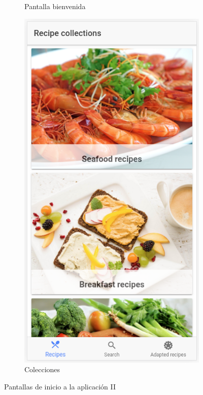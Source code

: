 \begin{figure}[H]
\begin{subfigure}[b]{0.32\linewidth}
        \caption{Pantalla bienvenida}
        \label{fig:app_welcome}
    \end{subfigure}
        \begin{subfigure}[b]{0.32\linewidth}
        \includegraphics[width=\linewidth]{imagenes/app/pantallas/app_1.png}
        \caption{Colecciones}
        \label{fig:app_coleccion}
    \end{subfigure}
    \caption{Pantallas de inicio a la aplicación II}
    \label{fig:pantallas_inicio2}
\end{figure}


